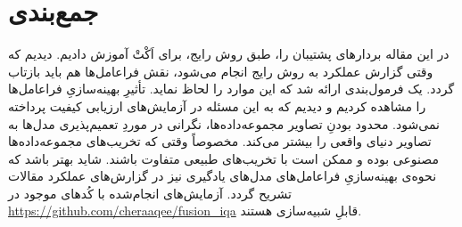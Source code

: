 \documentclass[twocolumn]{article}
\begin{document}
\section{جمع‌بندی} \label{sec:conclusion}
در این مقاله بردارهای پشتیبان را، طبق روش رایج، برای اَکْتْ آموزش دادیم. دیدیم که وقتی گزارش عملکرد به روش رایج انجام می‌شود، نقش فراعامل‌ها هم باید بازتاب گردد. یک فرمول‌بندی ارائه شد که این موارد را لحاظ نماید. تأثیرِ بهینه‌سازیِ فراعامل‌ها را مشاهده کردیم و دیدیم که به این مسئله در آزمایش‌های ارزیابی کیفیت پرداخته نمی‌شود. محدود بودنِ تصاویر مجموعه‌داده‌ها، نگرانی در موردِ تعمیم‌پذیری مدل‌ها به تصاویر دنیای واقعی را بیشتر می‌کند. مخصوصاً وقتی که تخریب‌های مجموعه‌داده‌ها مصنوعی بوده و ممکن است با تخریب‌های طبیعی متفاوت باشند. شاید بهتر باشد که نحوه‌ی بهینه‌سازیِ فراعامل‌های مدل‌های یادگیری نیز در گزارش‌های عملکرد مقالات تشریح گردد. آزمایش‌های انجام‌شده با کُدهای موجود در \href{https://github.com/cheraaqee/fusion\_iqa}{https://github.com/cheraaqee/fusion\_iqa} قابلِ شبیه‌سازی هستند.


\end{document}
